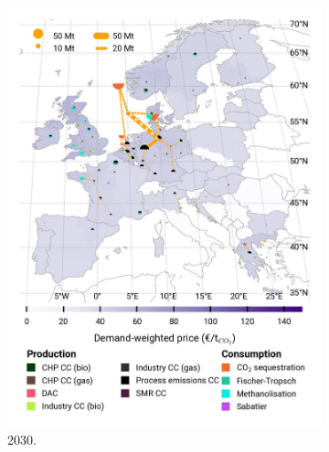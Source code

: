 \documentclass[preprint,12pt,sort&compress]{elsarticle}
\begin{document}
\begin{figure}[htbp]
\begin{subfigure}[t]{0.33\textwidth}
      \includegraphics[width=1\textwidth]{maps/pcipmi-national-expansion/base_s_adm___2030-balance_map_co2_stored} 
      \caption{ 2030.}
      \label{fig:PCI-n_lt_2030_co2}
  \end{subfigure}
  \begin{subfigure}[t]{0.33\textwidth}
      \vspace{0pt}

\end{subfigure}
\end{figure}
\end{document}
